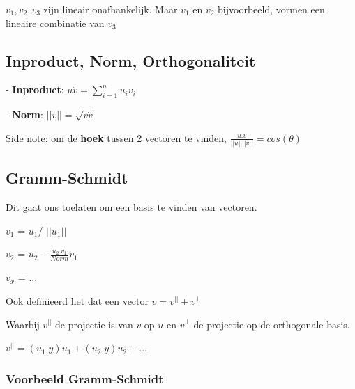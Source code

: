 \documentclass[a4paper]{report}
\begin{document}
$v_1, v_2, v_3$ zijn lineair onafhankelijk. Maar $v_1$ en $v_2$ bijvoorbeeld, vormen een lineaire combinatie van $v_3$

\subsection{Inproduct, Norm, Orthogonaliteit}

- \textbf{Inproduct}: $u \dot v = \sum_{i=1}^{n} u_i v_i$

- \textbf{Norm}: $||v|| = \sqrt{v \dot v}$

Side note: om de \textbf{hoek} tussen 2 vectoren te vinden, $\frac{u . v}{||u|| ||v||} = cos(\theta)$

\subsection{Gramm-Schmidt}

Dit gaat ons toelaten om een basis te vinden van vectoren.

$v_1$ = $u_1$/ $||u_1||$

$v_2$ = $u_2 - \frac{u_2 . v_1}{Norm} v_1$

$v_x$ = ...

Ook definieerd het dat een vector $v = v^{||} + v^{\perp}$

Waarbij $v^{||}$ de projectie is van $v$ op $u$ en $v^{\perp}$ de projectie op de orthogonale basis.

$v^{||} = (u_1 . y) u_1 + (u_2 . y) u_2 + ...$

\subsubsection{Voorbeeld Gramm-Schmidt}
\end{document}
